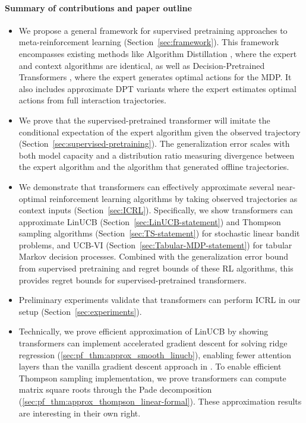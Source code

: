 \documentclass[10pt]{article}
\newcommand{\<}{\left\langle}
\renewcommand{\>}{\right\rangle}
\begin{document}
\paragraph{Summary of contributions and paper outline}
\begin{itemize}[leftmargin=1.5em]
\item We propose a general framework for supervised pretraining approaches to meta-reinforcement learning (Section~\ref{sec:framework}). This framework encompasses existing methods like Algorithm Distillation \citep{laskin2022context}, where the expert and context algorithms are identical, as well as Decision-Pretrained Transformers \citep{lee2023supervised}, where the expert generates optimal actions for the MDP. It also includes approximate DPT variants where the expert estimates optimal actions from full interaction trajectories.
\item We prove that the supervised-pretrained transformer will imitate the conditional expectation of the expert algorithm given the observed trajectory (Section~\ref{sec:supervised-pretraining}). The generalization error scales with both model capacity and a distribution ratio measuring divergence between the expert algorithm and the algorithm that generated offline trajectories.
\item We demonstrate that transformers can effectively approximate several near-optimal reinforcement learning algorithms by taking observed trajectories as context inputs (Section~\ref{sec:ICRL}). Specifically, we show transformers can approximate LinUCB (Section~\ref{sec:LinUCB-statement}) and Thompson sampling algorithms (Section~\ref{sec:TS-statement}) for stochastic linear bandit problems, and UCB-VI (Section~\ref{sec:Tabular-MDP-statement}) for tabular Markov decision processes. Combined with the generalization error bound from supervised pretraining and regret bounds of these RL algorithms, this provides regret bounds for supervised-pretrained transformers.
\item Preliminary experiments validate that transformers can perform ICRL in our setup (Section~\ref{sec:experiments}).
\item Technically, we prove efficient approximation of LinUCB by showing transformers can implement accelerated gradient descent for solving ridge regression (\cref{sec:pf_thm:approx_smooth_linucb}), enabling fewer attention layers than the vanilla gradient descent approach in \cite{bai2023transformers}. To enable efficient Thompson sampling implementation, we prove transformers can compute matrix square roots through the Pade decomposition (\cref{sec:pf_thm:approx_thompson_linear-formal}). These approximation results are interesting in their own right.
\end{itemize}
\end{document}
